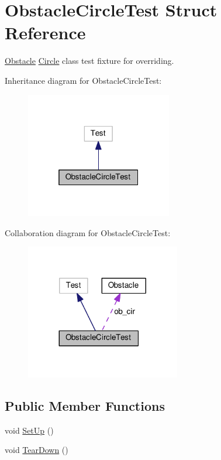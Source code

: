 \hypertarget{structObstacleCircleTest}{}\section{Obstacle\+Circle\+Test Struct Reference}
\label{structObstacleCircleTest}


\hyperlink{classObstacle}{Obstacle} \hyperlink{classCircle}{Circle} class test fixture for overriding.  




Inheritance diagram for Obstacle\+Circle\+Test\+:\nopagebreak
\begin{figure}[H]
\begin{center}
\leavevmode
\includegraphics[width=181pt]{structObstacleCircleTest__inherit__graph}
\end{center}
\end{figure}


Collaboration diagram for Obstacle\+Circle\+Test\+:\nopagebreak
\begin{figure}[H]
\begin{center}
\leavevmode
\includegraphics[width=191pt]{structObstacleCircleTest__coll__graph}
\end{center}
\end{figure}
\subsection*{Public Member Functions}
\begin{DoxyCompactItemize}
\item 
void \hyperlink{structObstacleCircleTest_a3f4cb1b05f4b820fb6042bd9278c516d}{Set\+Up} ()
\item 
void \hyperlink{structObstacleCircleTest_a994997c94bc7e1abc8055924051bcad6}{Tear\+Down} ()
\end{DoxyCompactItemize}
